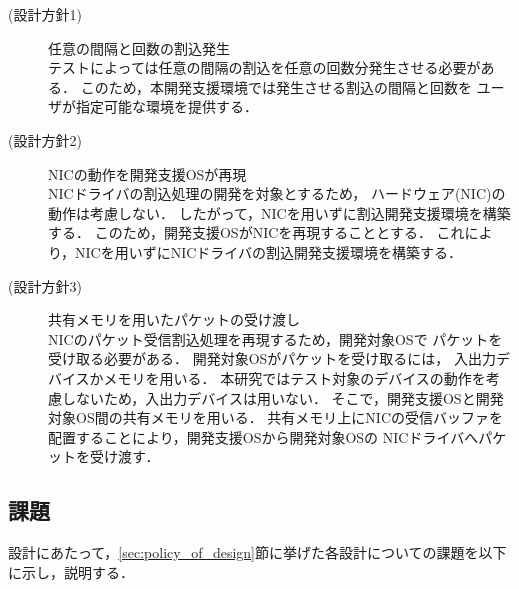\documentclass[submit,techreq,noauthor,dvipdfmx]{ipsj}
\begin{document}
\begin{description}
    \item[(設計方針1)] 任意の間隔と回数の割込発生\\
        テストによっては任意の間隔の割込を任意の回数分発生させる必要がある．
        このため，本開発支援環境では発生させる割込の間隔と回数を
        ユーザが指定可能な環境を提供する．
    \item[(設計方針2)] NICの動作を開発支援OSが再現\\
        NICドライバの割込処理の開発を対象とするため，
        ハードウェア(NIC)の動作は考慮しない．
        したがって，NICを用いずに割込開発支援環境を構築する．
        このため，開発支援OSがNICを再現することとする．
        これにより，NICを用いずにNICドライバの割込開発支援環境を構築する．
    \item[(設計方針3)] 共有メモリを用いたパケットの受け渡し\\
        NICのパケット受信割込処理を再現するため，開発対象OSで
        パケットを受け取る必要がある．
        開発対象OSがパケットを受け取るには，
        入出力デバイスかメモリを用いる．
        本研究ではテスト対象のデバイスの動作を考慮しないため，入出力デバイスは用いない．
        そこで，開発支援OSと開発対象OS間の共有メモリを用いる．
        共有メモリ上にNICの受信バッファを
        配置することにより，開発支援OSから開発対象OSの
        NICドライバへパケットを受け渡す．
\end{description}

\subsection{課題}\label{sec:challenge}

設計にあたって，\ref{sec:policy_of_design}節に挙げた各設計についての課題を以下に示し，説明する．
\end{document}
